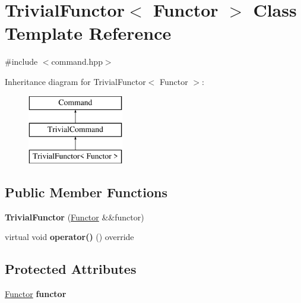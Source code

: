 \hypertarget{class_trivial_functor}{}\section{Trivial\+Functor$<$ Functor $>$ Class Template Reference}
\label{class_trivial_functor}


{\ttfamily \#include $<$command.\+hpp$>$}

Inheritance diagram for Trivial\+Functor$<$ Functor $>$\+:\begin{figure}[H]
\begin{center}
\leavevmode
\includegraphics[height=3.000000cm]{class_trivial_functor}
\end{center}
\end{figure}
\subsection*{Public Member Functions}
\begin{DoxyCompactItemize}
\item 
\mbox{\label{class_trivial_functor_ab5798bb2ea9fcdb5bf910662ac49c34c}} 
{\bfseries Trivial\+Functor} (\mbox{\hyperlink{class_functor}{Functor}} \&\&functor)
\item 
\mbox{\label{class_trivial_functor_a5f9b8d18c11a057c2b3e97703262d1e9}} 
virtual void {\bfseries operator()} () override
\end{DoxyCompactItemize}
\subsection*{Protected Attributes}
\begin{DoxyCompactItemize}
\item 
\mbox{\label{class_trivial_functor_a293617a9f9c35365e37237183c7e6fac}} 
\mbox{\hyperlink{class_functor}{Functor}} {\bfseries functor}
\end{DoxyCompactItemize}



